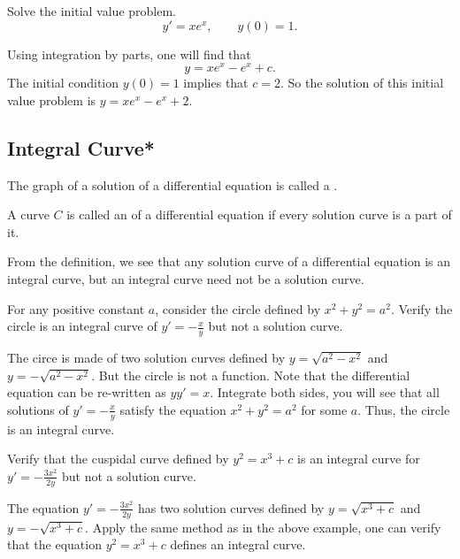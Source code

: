 \begin{exercise}
  Solve the initial value problem.
  $$y'= xe^x, \qquad y(0)=1.$$
\end{exercise}
\begin{exersol}
  Using integration by parts, one will find that
  $$y=xe^x-e^x+c.$$
  The initial condition $y(0)=1$ implies that $c=2$.
  So the solution of this initial value problem is $y=xe^x-e^x+2$.
\end{exersol}


\subsection{Integral Curve*}
\begin{definition}{}{}
  The graph of a solution of a differential equation is called a .

  A curve  $C$  is called an  of a differential equation if every solution curve is a part of it.
\end{definition}

From the definition, we see that any solution curve of a differential equation is an integral curve, but an integral curve need not be a solution curve.

\begin{example}\label{eg:1.1}
  For any positive constant $a$, consider the circle defined by $x^2+y^2=a^2$. Verify the circle is an integral curve of $y'=-\frac x y$ but not a solution curve.
\end{example}
\begin{solution}
  The circe is made of two solution curves defined by $y=\sqrt{a^2-x^2}$ and $y=-\sqrt{a^2-x^2}$. But the circle is not a function. Note that the differential equation can be re-written as $yy'=x$. Integrate both sides, you will see that all solutions of $y'=-\frac x y$ satisfy the equation $x^2+y^2=a^2$ for some $a$. Thus, the circle is an integral curve.
\end{solution}

\begin{exercise}
  Verify that the cuspidal curve defined by $y^2=x^3+c$ is an integral curve for $y'=-\frac{3x^2}{2y}$ but not a solution curve.
\end{exercise}
\begin{exersol}
  The equation $y'=-\frac{3x^2}{2y}$ has two solution curves defined by $y=\sqrt{x^3+c}$ and $y=-\sqrt{x^3+c}$. Apply the same method as in the above example, one can verify that the equation $y^2=x^3+c$ defines an integral curve.
\end{exersol}


